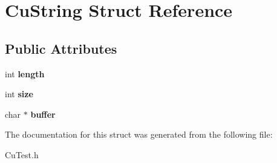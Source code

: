 \hypertarget{structCuString}{}\section{Cu\+String Struct Reference}
\label{structCuString}
\subsection*{Public Attributes}
\begin{DoxyCompactItemize}
\item 
\mbox{\label{structCuString_a5e715d2b207fe60a0433e8bf0ed0e470}} 
int {\bfseries length}
\item 
\mbox{\label{structCuString_abddb898dd12ac916879510d4c4c97f05}} 
int {\bfseries size}
\item 
\mbox{\label{structCuString_ab202a8630764f5864030f8a8a4ae6911}} 
char $\ast$ {\bfseries buffer}
\end{DoxyCompactItemize}


The documentation for this struct was generated from the following file\+:\begin{DoxyCompactItemize}
\item 
Cu\+Test.\+h\end{DoxyCompactItemize}
